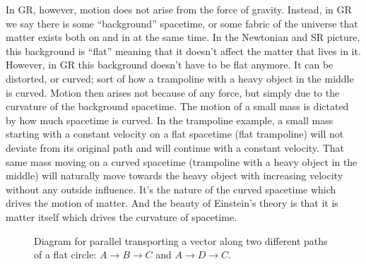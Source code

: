 \begin{bibunit}[unsrtnat]
In GR, however, motion does not arise from the force of gravity. Instead, in GR
we say there is some ``background'' spacetime, or some fabric of the universe
that matter exists both on and in at the same time. In the Newtonian and SR
picture, this background is ``flat'' meaning that it doesn't affect the matter
that lives in it. However, in GR this background doesn't have to be flat
anymore. It can be distorted, or curved; sort of how a trampoline with a heavy
object in the middle is curved. Motion then arises not because of any force, but
simply due to the curvature of the background spacetime. The motion of a small
mass is dictated by how much spacetime is curved. In the trampoline example, a
small mass starting with a constant velocity on a flat spacetime (flat
trampoline) will not deviate from its original path and will continue with a
constant velocity. That same mass moving on a curved spacetime (trampoline with
a heavy object in the middle) will naturally move towards the heavy object with
increasing velocity without any outside influence. It's the nature of the curved
spacetime which drives the motion of matter. And the beauty of Einstein's theory
is that it is matter itself which drives the curvature of spacetime.

\begin{figure}[htb]
   \centering
   \caption[Parallel transport on a flat circle.]{Diagram for parallel
      transporting a vector along two different paths of a flat circle:
      $A\rightarrow B\rightarrow C$ and $A\rightarrow D \rightarrow C$.}
   \label{fig:parallel-transport-circle}
\end{figure}


\end{bibunit}
